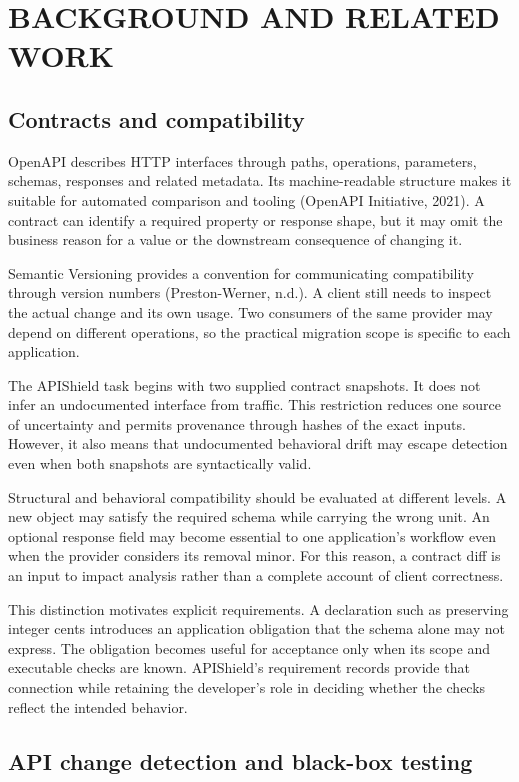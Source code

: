 \documentclass[12pt,a4paper,oneside]{report}
\begin{document}
\chapter{BACKGROUND AND RELATED WORK}
\section{Contracts and compatibility}

OpenAPI describes HTTP interfaces through paths, operations, parameters, schemas, responses and related metadata. Its machine-readable structure makes it suitable for automated comparison and tooling (OpenAPI Initiative, 2021). A contract can identify a required property or response shape, but it may omit the business reason for a value or the downstream consequence of changing it.

Semantic Versioning provides a convention for communicating compatibility through version numbers (Preston-Werner, n.d.). A client still needs to inspect the actual change and its own usage. Two consumers of the same provider may depend on different operations, so the practical migration scope is specific to each application.

The APIShield task begins with two supplied contract snapshots. It does not infer an undocumented interface from traffic. This restriction reduces one source of uncertainty and permits provenance through hashes of the exact inputs. However, it also means that undocumented behavioral drift may escape detection even when both snapshots are syntactically valid.

Structural and behavioral compatibility should be evaluated at different levels. A new object may satisfy the required schema while carrying the wrong unit. An optional response field may become essential to one application's workflow even when the provider considers its removal minor. For this reason, a contract diff is an input to impact analysis rather than a complete account of client correctness.

This distinction motivates explicit requirements. A declaration such as preserving integer cents introduces an application obligation that the schema alone may not express. The obligation becomes useful for acceptance only when its scope and executable checks are known. APIShield's requirement records provide that connection while retaining the developer's role in deciding whether the checks reflect the intended behavior.

\section{API change detection and black-box testing}
\end{document}
